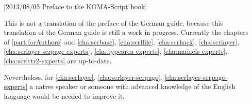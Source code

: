 %
%
%
%
%
%
%
%
%

[2013/08/05 Preface to the KOMA-Script book]



This is not a translation of the preface of the German \KOMAScript{} guide,
because this translation of the German \KOMAScript{} guide is still a work in
progress. Currently the chapters of \autoref{part:forAuthors} and
\autoref{cha:scrbase}, \autoref{cha:scrlfile}, \autoref{cha:scrhack},
\autoref{cha:scrlayer}, \autoref{cha:scrlayer-scrpage-experts},
\autoref{cha:typearea-experts}, \autoref{cha:maincls-experts},
\autoref{cha:scrlttr2-experts} are up-to-date.

Nevertheless, for \autoref{cha:scrlayer}, \autoref{cha:scrlayer-scrpage},
\autoref{cha:scrlayer-scrpage-experts} a native speaker or someone with
advanced knowledge of the English language would be needed to improve it.

